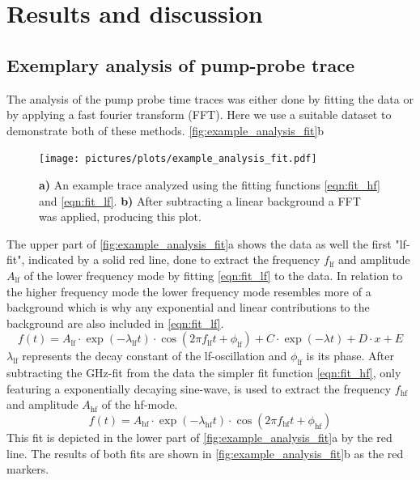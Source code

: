 \chapter{Results and discussion}
\section{Exemplary analysis of pump-probe trace}
The analysis of the pump probe time traces was either done by fitting the data or by applying a fast fourier transform (FFT).
Here we use a suitable dataset to demonstrate both of these methods.
\autoref{fig:example_analysis_fit}b
\begin{figure}[ht]
    \centering
    \texttt{[image: pictures/plots/example\_analysis\_fit.pdf]}
    \caption{\textbf{a)} An example trace analyzed using the fitting functions \autoref{eqn:fit_hf} and \autoref{eqn:fit_lf}. \textbf{b)} After subtracting a linear background a FFT was applied, producing this plot.}
    \label{fig:example_analysis_fit}
\end{figure}
\FloatBarrier
The upper part of \autoref{fig:example_analysis_fit}a shows the data as well the first "lf-fit", indicated by a solid red line, done to extract the frequency $f_{\text{lf}}$ and amplitude $A_{\text{lf}}$ of the lower frequency mode by fitting \autoref{eqn:fit_lf} to the data.
In relation to the higher frequency mode the lower frequency mode resembles more of a background which is why any exponential and linear contributions to the background are also included in \autoref{eqn:fit_lf}.
\begin{equation}
    f(t) = A_{\text{lf}} \cdot \exp(-\lambda_{\text{lf}} t) \cdot \cos(2 \pi f_{\text{lf}} t + \phi_{\text{lf}}) + C \cdot \exp(-\lambda t) + D \cdot x + E
    \label{eqn:fit_lf}
\end{equation}
$\lambda_{\text{lf}}$ represents the decay constant of the lf-oscillation and $\phi_{\text{lf}}$ is its phase.
After subtracting the GHz-fit from the data the simpler fit function \autoref{eqn:fit_hf}, only featuring a exponentially decaying sine-wave, is used to extract the frequency $f_{\text{hf}}$ and amplitude $A_{\text{hf}}$ of the hf-mode.
\begin{equation}
    f(t) = A_{\text{hf}} \cdot \exp(-\lambda_{\text{hf}} t) \cdot \cos(2 \pi f_{\text{hf}} t + \phi_{\text{hf}})
    \label{eqn:fit_hf}
\end{equation}
This fit is depicted in the lower part of \autoref{fig:example_analysis_fit}a by the red line.
The results of both fits are shown in \autoref{fig:example_analysis_fit}b as the red markers.


